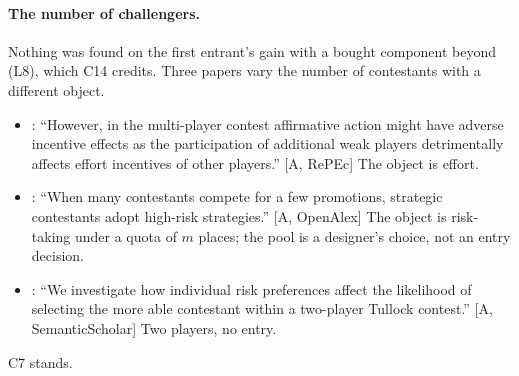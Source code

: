 \documentclass[11pt,a4paper]{article}
\newcommand{\aq}[2]{``#2''}
\begin{document}
\paragraph{The number of challengers.} Nothing was found on the first
entrant's gain with a bought component beyond \citet{RyvkinDrugov2020} (L8),
which C14 credits. Three papers vary the number of contestants with a
different object.
\begin{itemize}
\item \citet{Franke2012}: \aq{Franke2012}{However, in the multi-player contest affirmative action might have adverse incentive effects as the participation of additional weak players detrimentally affects effort incentives of other players.} [A, RePEc] The object is effort.
\item \citet{FangNoe2022}: \aq{FangNoe2022}{When many contestants compete for a few promotions, strategic contestants adopt high-risk strategies.} [A, OpenAlex] The object is risk-taking under a
  quota of $m$ places; the pool is a designer's choice, not an entry decision.
\item \citet{MarchSahm2018}: \aq{MarchSahm2018}{We investigate how individual risk preferences affect the likelihood of selecting the more able contestant within a two-player Tullock contest.} [A, SemanticScholar] Two players, no entry.
\end{itemize}
C7 stands.
\end{document}
